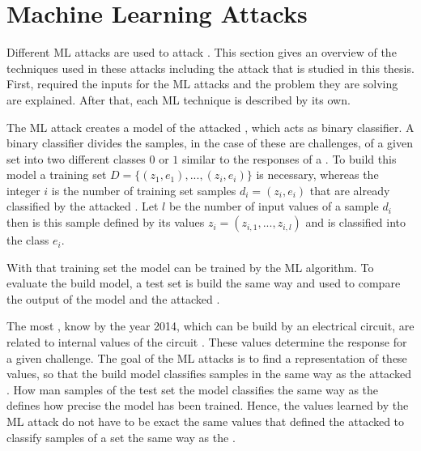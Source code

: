 \chapter{Machine Learning Attacks}
\label{cap:mla}

Different \ac{ML} attacks are used to attack \pufs.
This section gives an overview of the techniques used in these attacks including the attack that is studied in this thesis. %
First, required the inputs for the \ac{ML} attacks and the problem they are solving are explained.
After that, each \ac{ML} technique is described by its own.

The \ac{ML} attack creates a \puf model of the attacked \puf, which acts as binary classifier.
A binary classifier divides the samples, in the case of \pufs these are challenges, of a given set into two different classes $0$ or $1$ similar to the responses of a \puf. %
To build this model a training set $D = \{(z_1, e_1), ..., (z_i,e_i)\}$ is necessary, whereas the integer $i$ is the number of training set samples $d_i = (z_i, e_i)$ that are already classified by the attacked \puf.
Let $l$ be the number of input values of a sample $d_i$ then is this sample defined by its values $z_i = (z_{i,1}, ...,z_{i,l})$ and is classified into the class $e_i$. 

With that training set the model can be trained by the \ac{ML} algorithm.
To evaluate the build model, a test set is build the same way and used to compare the output of the \puf model and the attacked \puf.

The most \pufs, know by the year 2014, which can be build by an electrical circuit, are related to internal values of the circuit \cite{Ruhrmair2014PUFOverview}.
These values determine the response for a given challenge. %
The goal of the \ac{ML} attacks is to find a representation of these values, so that the build model classifies samples in the same way as the attacked \puf. %
How man samples of the test set the model classifies the same way as the \puf defines how precise the model has been trained. %
Hence, the values learned by the \ac{ML} attack do not have to be exact the same values that defined the attacked \puf to classify samples of a set the same way as the \puf.

